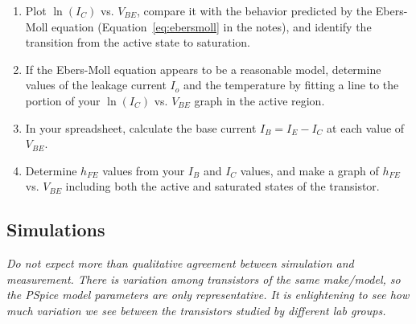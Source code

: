 \documentclass[11pt]{article}
\begin{document}
\begin{enumerate}
\item Plot $\ln(I_C)$ vs. $V_{BE}$, compare it with the behavior
  predicted by the Ebers-Moll equation (Equation~\ref{eq:ebersmoll} in
  the notes), and identify the transition from the active state to
  saturation.

\item If the Ebers-Moll equation appears to be a reasonable model,
  determine values of the leakage current $I_o$ and the temperature by
  fitting a line to the portion of your $\ln(I_C)$ vs. $V_{BE}$ graph
  in the active region. 

\item In your spreadsheet, calculate the base current $I_B = I_E -
  I_C$ at each value of $V_{BE}$.
  
\item Determine $h_{FE}$ values from your $I_B$ and $I_C$ values, and
  make a graph of $h_{FE}$ vs. $V_{BE}$ including both the active and
  saturated states of the transistor.
\end{enumerate}

\subsection*{Simulations}

\emph{Do not expect more than qualitative agreement between simulation
and measurement. There is variation among transistors of the same
make/model, so the PSpice model parameters are only representative. It
is enlightening to see how much variation we see between the transistors
studied by different lab groups.}
\end{document}
